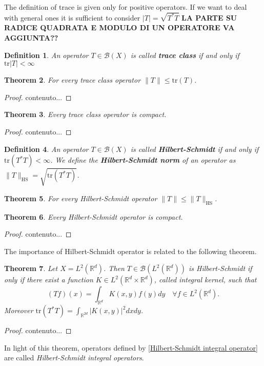 \documentclass[corpo=11pt, stile=classica, tipotesi=custom,
greek, evenboxes, english]{toptesi}
\numberwithin{equation}{chapter}
\newtheorem{teo}{Theorem}[chapter] %
\newtheorem{defi}[teo]{Definition}
\newcommand{\R}{\mathbb{R}} %
\newcommand{\B}{\mathscr{B}} %
\begin{document}
{\color{red}The definition of trace is given only for positive operators. If we want to deal with general ones it is sufficient to consider $|T|=\sqrt{T^*T}$ \textbf{LA PARTE SU RADICE QUADRATA E MODULO DI UN OPERATORE VA AGGIUNTA??}}
\begin{defi}\label{trace class def}
	An operator $T \in \B(X)$ is called \textbf{trace class} if and only if $\mathrm{tr}|T| < \infty$
\end{defi}
\begin{teo}
	For every trace class operator $\| T \| \leq \mathrm{tr}(T)$.
\end{teo}
\begin{proof}
	contenuto...
\end{proof}
\begin{teo}
	Every trace class operator is compact.
\end{teo}
\begin{proof}
	contenuto...
\end{proof}
\begin{defi}\label{Hilbert-Schmidt operator def}
	An operator $T \in \B(X)$ is called \textbf{Hilbert-Schmidt} if and only if $\mathrm{tr}(T^*T) < \infty$. We define the \textbf{Hilbert-Schmidt norm} of an operator as $\|T\|_{\mathrm{HS}} = \sqrt{\mathrm{tr}(T^*T)}$.
\end{defi}
\begin{teo}\label{Hilbert-Schmidt operator norm}
	For every Hilbert-Schmidt operator $\| T \| \leq \| T \|_{\mathrm{HS}}$.
\end{teo}
\begin{teo}\label{Hilbert-Schmidt operators are compact}
	Every Hilbert-Schmidt operator is compact.
\end{teo}
\begin{proof}
	contenuto...
\end{proof}
The importance of Hilbert-Schmidt operator is related to the following theorem.
\begin{teo}
	Let $X = L^2(\R^d)$. Then $T \in \B(L^2(\R^d))$ is Hilbert-Schmidt if only if there exist a function $K \in L^2(\R^d \times \R^d)$, called integral kernel, such that
	\begin{equation}\label{Hilbert-Schmidt integral operator}
		(Tf)(x) = \int_{\R^d} K(x,y)f(y)dy \quad \forall f \in L^2(\R^d).
	\end{equation}
	Moreover $\mathrm{tr}(T^*T) = \int_{\R^{2d}} |K(x,y)|^2 dxdy$.
\end{teo}
\begin{proof}
	contenuto...
\end{proof}
In light of this theorem, operators defined by \eqref{Hilbert-Schmidt integral operator} are called \emph{Hilbert-Schmidt integral operators}.
\end{document}
